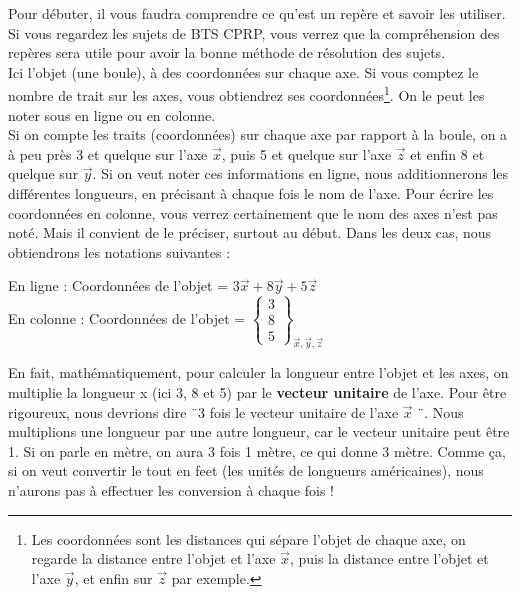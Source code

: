\documentclass[
	11pt, %
	fleqn, %
	a4paper, %
]{LegrandOrangeBook}
\begin{document}
Pour débuter, il vous faudra comprendre ce qu'est un repère et savoir les utiliser. Si vous regardez les sujets de BTS CPRP, vous verrez que la compréhension des repères sera utile pour avoir la bonne méthode de résolution des sujets.\\


Ici l'objet (une boule), à des coordonnées sur chaque axe. Si vous comptez le {\color{blue} nombre de trait} sur les axes, vous obtiendrez ses coordonnées\footnote{Les coordonnées sont les distances qui sépare l'objet de chaque axe, on regarde la distance entre l'objet et l'axe $\vec{x}$, puis la distance entre l'objet et l'axe $\vec{y}$, et enfin sur $\vec{z}$ par exemple.}. On le peut les noter sous en ligne ou en colonne.\\


Si on compte les traits (coordonnées) sur chaque axe par rapport à la boule, on a à peu près 3 et quelque sur l'axe $\vec{x}$, puis 5 et quelque sur l'axe $\vec{z}$ et enfin 8 et quelque sur $\vec{y}$. Si on veut noter ces informations en ligne, nous additionnerons les différentes longueurs, en précisant à chaque fois le nom de l'axe. Pour écrire les coordonnées en colonne, vous verrez certainement que le nom des axes n'est pas noté. Mais il convient de le préciser, surtout au début. Dans les deux cas, nous obtiendrons les notations suivantes :

\begin{center}
    

En ligne : Coordonnées de l'objet = $3\vec{x} + 8\vec{y} + 5\vec{z}$ \\
En colonne : Coordonnées de l'objet = $ \left\{ \begin{array}{c}
     3 \\
     8 \\
     5
\end{array} \right\} _{\vec{x}, \vec{y}, \vec{z}}$
\end{center}

\begin{remark}
    En fait, mathématiquement, pour calculer la longueur entre l'objet et les axes, on multiplie la longueur x (ici 3, 8 et 5) par le \textbf{vecteur unitaire} de l'axe. Pour être rigoureux, nous devrions dire ¨3 fois le vecteur unitaire de l'axe $\vec{x}$ ¨. Nous multiplions une longueur par une autre longueur, car le vecteur unitaire peut être 1. Si on parle en mètre, on aura 3 fois 1 mètre, ce qui donne 3 mètre. Comme ça, si on veut convertir le tout en feet (les unités de longueurs américaines), nous n'aurons pas à effectuer les conversion à chaque fois !
\end{remark}
\end{document}
